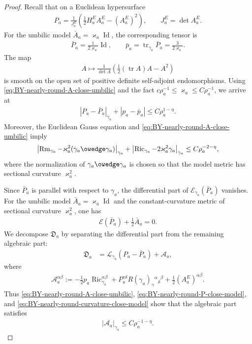 \documentclass[10pt]{amsart}
\newcommand{\tr}{\operatorname{tr}}
\newcommand{\Ric}{\operatorname{Ric}}
\newcommand{\Rm}{\operatorname{Rm}}
\newcommand{\Id}{\operatorname{Id}}
\theoremstyle{plain}
\theoremstyle{remark}
\begin{document}
\begin{proof}
		Recall that on a Euclidean hypersurface
		\begin{align*}
			P_a
			=
			\frac{1}{J_a^E}
			\left(
			\frac12 H_a^E A_a^E-(A_a^E)^2
			\right),
			\qquad
			J_a^E=\det A_a^E .
		\end{align*}
		For the umbilic model $\bar A_a=\varkappa_a\Id$, the
		corresponding tensor is
		\begin{align*}
			\bar P_a=\frac{1}{2\varkappa_a}\operatorname{Id},
			\qquad
			\bar p_a=\tr_{\gamma_a}\bar P_a
			=
			\frac{3}{2\varkappa_a}.
		\end{align*}
		The map
		\begin{align*}
			A\longmapsto
			\frac{1}{\det A}
			\left(
			\frac12(\operatorname{tr}A)A-A^2
			\right)
		\end{align*}
		is smooth on the open set of positive definite self-adjoint endomorphisms. Using
		\eqref{eq:BY-nearly-round-A-close-umbilic} and the fact $c\rho_a^{-1}\leq \varkappa_a\leq C\rho_a^{-1}$, we arrive at
		\begin{align}
			\label{eq:BY-nearly-round-P-close-model}
			|P_a-\bar P_a|_{\gamma_a}
			+
			|p_a-\bar p_a|
			\leq
			C\rho_a^{1-\eta}.
		\end{align}
		Moreover, the Euclidean Gauss equation and
		\eqref{eq:BY-nearly-round-A-close-umbilic} imply
		\begin{align}
			\label{eq:BY-nearly-round-curvature-close-model}
			\left|
			\Rm_{\gamma_a}
			-
			\varkappa_a^2(\gamma_a\owedge\gamma_a)
			\right|_{\gamma_a}
			+
			\left|
			\Ric_{\gamma_a}
			-
			2\varkappa_a^2\gamma_a
			\right|_{\gamma_a}
			\leq
			C\rho_a^{-2-\eta},
		\end{align}
		where the normalization of $\gamma_a\owedge\gamma_a$ is chosen so that
		the model metric has sectional curvature $\varkappa_a^2$.
		
		Since $\bar P_a$ is parallel with respect to $\gamma_a$, the differential
		part of $\mathcal E_{\gamma_a}(\bar P_a)$ vanishes. For the umbilic model
		$\bar A_a=\varkappa_a\Id$ and the constant-curvature metric of sectional
		curvature $\varkappa_a^2$, one has
		\begin{align*}
			\mathcal E(\bar P_a)+\frac12\bar A_a=0.
		\end{align*}
		We decompose $\mathfrak D_a$ by separating the differential part from the
		remaining algebraic part:
		\begin{align*}
			\mathfrak D_a
			&=
			\mathcal L_{\gamma_a}(P_a-\bar P_a)
			+
			\mathcal A_a,
		\end{align*}
		where
		\begin{align*}
			\mathcal A_a^{\alpha\beta}
			:=
			-\frac12 p_a\Ric_{\gamma_a}^{\alpha\beta}
			+
			P_a^{\gamma\delta}
			R(\gamma_a)_{\gamma}{}^{\alpha}{}_{\delta}{}^{\beta}
			+
			\frac12(A_a^E)^{\alpha\beta}.
		\end{align*}
		Thus \eqref{eq:BY-nearly-round-A-close-umbilic},
		\eqref{eq:BY-nearly-round-P-close-model}, and
		\eqref{eq:BY-nearly-round-curvature-close-model} show that the algebraic
		part satisfies
		\begin{align*}
			|\mathcal A_a|_{\gamma_a}
			\leq
			C\rho_a^{-1-\eta}.
		\end{align*}
		

\end{proof}
\end{document}
